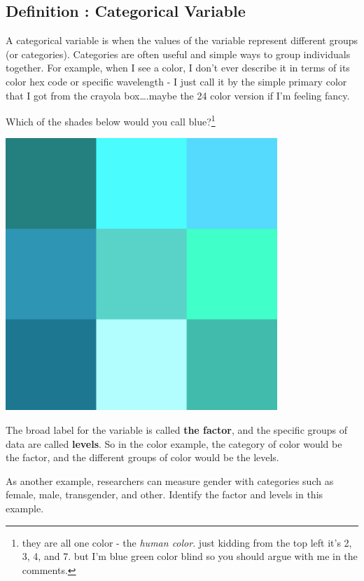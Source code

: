 \documentclass[
  letterpaper,
  DIV=11,
  numbers=noendperiod,
  oneside]{scrreprt}
\begin{document}
\subsection{Definition : Categorical
Variable}\label{definition-categorical-variable}

A categorical variable is when the values of the variable represent
different groups (or categories). Categories are often useful and simple
ways to group individuals together. For example, when I see a color, I
don't ever describe it in terms of its color hex code or specific
wavelength - I just call it by the simple primary color that I got from
the crayola box\ldots.maybe the 24 color version if I'm feeling fancy.

Which of the shades below would you call blue?\footnote{they are all one
  color - the \emph{human color}. just kidding from the top left it's 2,
  3, 4, and 7. but I'm blue green color blind so you should argue with
  me in the comments.}

\begin{center}
\includegraphics[width=4.04167in,height=\textheight,keepaspectratio]{chapters/images/2_shadesofcyan.png}
\end{center}

The broad label for the variable is called \textbf{the factor}, and the
specific groups of data are called \textbf{levels}. So in the color
example, the category of color would be the factor, and the different
groups of color would be the levels.

As another example, researchers can measure gender with categories such
as female, male, transgender, and other. Identify the factor and levels
in this example.
\end{document}
